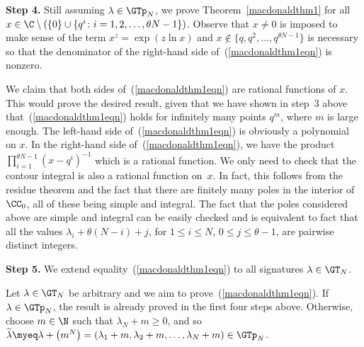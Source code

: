\textbf{Step 4.} Still assuming $\lambda\in\GTp_N$, we prove Theorem~\ref{macdonaldthm1} for all $x\in\C \setminus (\{0\}\cup\{q^i \colon i = 1, 2, \dots, \theta N - 1\})$. Observe that $x\neq 0$ is imposed to make sense of the term $x^z = \exp(z\ln{x})$ and $x\notin\{q, q^2, \dots, q^{\theta N - 1}\}$ is necessary so that the denominator of the right-hand side of~(\ref{macdonaldthm1eqn}) is nonzero.

We claim that both sides of~(\ref{macdonaldthm1eqn}) are rational functions of $x$. This would prove the desired result, given that we have shown in step~3 above that~(\ref{macdonaldthm1eqn}) holds for inf\/initely many points $q^m$, where $m$ is large enough. The left-hand side of~(\ref{macdonaldthm1eqn}) is obviously a polynomial on $x$. In the right-hand side of~(\ref{macdonaldthm1eqn}), we have the product $\prod\limits_{i=1}^{\theta N - 1}{(x - q^i)^{-1}}$ which is a rational function. We only need to check that the contour integral is also a rational function on~$x$. In fact, this follows from the residue theorem and the fact that there are f\/initely many poles in the interior of~$\CC_0$, all of these being simple and integral. The fact that the poles considered above are simple and integral can be easily checked and is equivalent to fact that all the values $\lambda_i + \theta(N - i) + j$, for $1\leq i\leq N$, $0\leq j\leq \theta - 1$, are pairwise distinct integers.

\textbf{Step 5.} We extend equality~(\ref{macdonaldthm1eqn}) to all signatures $\lambda\in\GT_N$.

Let $\lambda\in\GT_N$ be arbitrary and we aim to prove~(\ref{macdonaldthm1eqn}). If $\lambda\in\GTp_N$, the result is already proved in the f\/irst four steps above. Otherwise, choose $m\in\N$ such that $\lambda_N + m \geq 0$, and so $\widetilde{\lambda} \myeq \lambda + \big(m^N\big) = (\lambda_1 + m, \lambda_2 + m, \dots, \lambda_N + m)\in\GTp_N$.

